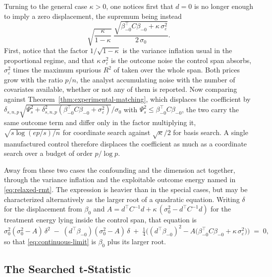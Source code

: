 Turning to the general case $\kappa > 0$, one notices first that $d = 0$
is no longer enough to imply a zero displacement, the supremum being
instead
\begin{equation*}
        \sqrt{\frac{\kappa}{1-\kappa}}\;
        \frac{\sqrt{\beta_{-0}^\top C \beta_{-0}
        + \kappa\, \sigma_\varepsilon^2}}{2\, \sigma_0}.
\end{equation*}
First, notice that the factor $1/\sqrt{1-\kappa}$ is the variance
inflation usual in the proportional regime, and that
$\kappa\, \sigma_\varepsilon^2$ is the outcome noise the control span
absorbs, $\sigma_\varepsilon^2$ times the maximum spurious $R^2$ of
\citet{fanShaoZhou2018spurious} taken over the whole span. Both prices
grow with the ratio $p/n$, the analyst accumulating noise with the number
of covariates available, whether or not any of them is reported. Now
comparing against Theorem~\ref{thm:experimental-matching}, which
displaces the coefficient by
$\delta_{s,n,p} \sqrt{\Psi_s^2 + \delta_{s,n,p}^2
(\beta_{-0}^\top C \beta_{-0} + \sigma_\varepsilon^2)} / \sigma_0$ with
$\Psi_s^2 \le \beta_{-0}^\top C \beta_{-0}$, the two carry the same
outcome term and differ only in the factor multiplying it,
$\sqrt{s \log(ep/s)/n}$ for coordinate search against $\sqrt\kappa/2$
for basis search. A single manufactured control therefore displaces the
coefficient as much as a coordinate search over a budget of order
$p / \log p$.

Away from these two cases the confounding and the dimension act together,
through the variance inflation and the exploitable outcome energy named
in \eqref{eq:relaxed-rmt}. The expression is heavier than in the special
cases, but may be characterized alternatively as the larger root of a
quadratic equation. Writing $\delta$ for the displacement from $\beta_0$
and $A = d^\top C^{-1} d + \kappa\,(\sigma_0^2 - d^\top C^{-1} d)$ for
the treatment energy lying inside the control span, that equation is
\begin{equation}\label{eq:cont-quadratic}
        \sigma_0^2 (\sigma_0^2 - A)\, \delta^2
        \;-\; (d^\top \beta_{-0}) (\sigma_0^2 - A)\, \delta
        \;+\; \tfrac14 \Big( (d^\top \beta_{-0})^2
        - A \big( \beta_{-0}^\top C \beta_{-0}
        + \kappa\, \sigma_\varepsilon^2 \big) \Big)
        \;=\; 0,
\end{equation}
so that \eqref{eq:continuous-limit} is $\beta_0$ plus its larger root.

\subsection{The Searched t-Statistic}


